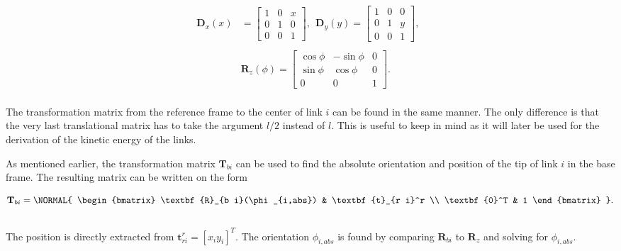 \begin{equation}\label{eq:trans_rot}
    \begin{split}
        \textbf{D}_x(x)& = 
        \begin{bmatrix}
            1 & 0 & x \\
            0 & 1 & 0 \\
            0 & 0 & 1
        \end{bmatrix}, \ \
        \textbf{D}_y(y) =
        \begin{bmatrix}
            1 & 0 & 0 \\
            0 & 1 & y \\
            0 & 0 & 1
        \end{bmatrix}, \ \
        \\&
        \\&\textbf{R}_z(\phi) =
        \begin{bmatrix}
            \cos{\phi} & -\sin{\phi} & 0 \\
            \sin{\phi} &  \cos{\phi} & 0 \\
            0          &  0          & 1
        \end{bmatrix}.
    \end{split}
\end{equation}
\\
The transformation matrix from the reference frame to the center of link $i$ can be found in the same manner. The only difference is that the very last translational matrix has to take the argument $l/2$ instead of $l$. This is useful to keep in mind as it will later be used for the derivation of the kinetic energy of the links.

As mentioned earlier, the transformation matrix $\textbf{T}_{b i}$ can be used to find the absolute orientation and position of the tip of link $i$ in the base frame.
The resulting matrix can be written on the form

\begin{equation}
    \textbf{T}_{b i} =
    \NORMAL{
    \begin{bmatrix}
        \textbf{R}_{b i}(\phi_{i,abs}) & \textbf{t}_{r i}^r \\
        \textbf{0}^T & 1
    \end{bmatrix} }.
\end{equation}
\\
The position is directly extracted from $\textbf{t}_{r i}^r = [x_i y_i]^T$. The orientation $\phi_{i,abs}$ is found by comparing $\textbf{R}_{b i}$ to $\textbf{R}_z$ and solving for $\phi_{i,abs}$.

